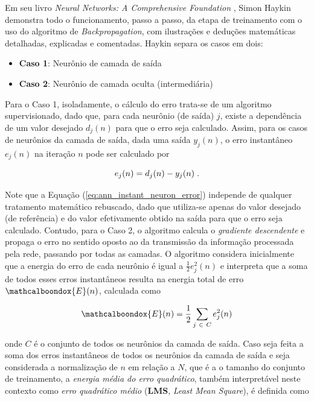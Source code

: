 Em seu livro \textit{Neural Networks: A Comprehensive Foundation} \citep{haykin1999neural}, Simon Haykin demonstra todo o funcionamento, passo a passo, da etapa de treinamento com o uso do algoritmo de \textit{Backpropagation}, com ilustrações e deduções matemáticas detalhadas, explicadas e comentadas. Haykin separa os casos em dois:

\begin{itemize}
    \item \textbf{Caso 1}: Neurônio de camada de saída
    \item \textbf{Caso 2}: Neurônio de camada oculta (intermediária)
\end{itemize}

Para o Caso 1, isoladamente, o cálculo do erro trata-se de um algoritmo supervisionado, dado que, para cada neurônio (de saída) $j$, existe a dependência de um valor desejado $d_{j}(n)$ para que o erro seja calculado. Assim, para os casos de neurônios da camada de saída, dada uma saída $y_{j}(n)$, o erro instantâneo $e_{j}(n)$ na iteração $n$ pode ser calculado por

\begin{equation}
    e_{j}(n) = d_{j}(n) - y_{j}(n)
    \label{eq:ann_instant_neuron_error}
    \hspace{0.1cm}.
    \vspace{0.2cm}
\end{equation}

Note que a Equação (\ref{eq:ann_instant_neuron_error}) independe de qualquer tratamento matemático rebuscado, dado que utiliza-se apenas do valor desejado (de referência) e do valor efetivamente obtido na saída para que o erro seja calculado. Contudo, para o Caso 2, o algoritmo calcula o \textit{gradiente descendente} \citep{cauchy1847methode} e propaga o erro no sentido oposto ao da transmissão da informação processada pela rede, passando por todas as camadas. O algoritmo considera inicialmente que a energia do erro de cada neurônio é igual a $\frac{1}{2}e_{j}^{2}(n)$ e interpreta que a soma de todos esses erros instantâneos resulta na energia total de erro $\mathcalboondox{E}(n)$, calculada como

\begin{equation}
    \mathcalboondox{E}(n) = \dfrac{1}{2}\sum_{j\ \in\ C}e_{j}^{2}(n)
    \label{eq:ann_total_error_energy}
    \vspace{0.2cm}
\end{equation}

\noindent onde $C$ é o conjunto de todos os neurônios da camada de saída. Caso seja feita a soma dos erros instantâneos de todos os neurônios da camada de saída e seja considerada a normalização de $n$ em relação a $N$, que é a o tamanho do conjunto de treinamento, a \textit{energia média do erro quadrático}, também interpretável neste contexto como \textit{erro quadrático médio} (\textbf{LMS}, \textit{Least Mean Square}), é definida como

